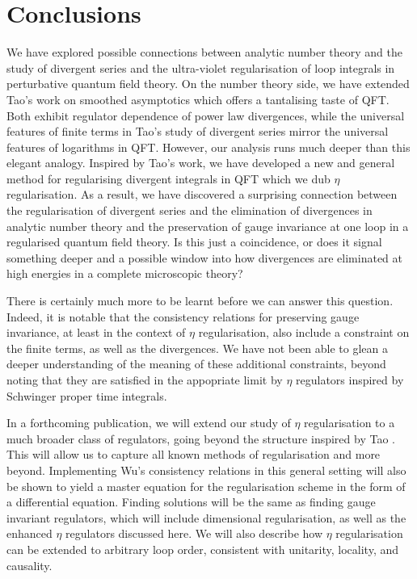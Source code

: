 \documentclass[11pt, letter]{article}
\begin{document}
\section{Conclusions} \label{sec:conc}

We have explored possible connections between analytic number theory and the study of divergent series and the ultra-violet regularisation of loop integrals in perturbative quantum field theory.  On the number theory side, we have extended Tao's work on smoothed asymptotics \cite{Tao11} which offers a tantalising taste of QFT. Both exhibit regulator dependence of power law divergences, while the universal features of finite terms in Tao's study of divergent series mirror the universal features of logarithms in QFT. However, our analysis runs much deeper than this elegant analogy.  Inspired by Tao's work, we have developed a new and general method for regularising divergent  integrals in QFT which we dub $\eta$ regularisation. As a result, we have discovered a surprising connection between the regularisation of divergent series and the elimination of divergences in analytic number theory and the preservation of gauge invariance at one loop in a regularised quantum field theory. Is this just a coincidence, or does it signal something deeper and a possible window into how divergences are eliminated at high energies in a complete microscopic theory?  

There is certainly much more to be learnt before we can answer this question. Indeed, it is notable that the consistency relations for preserving gauge invariance, at least in the context of $\eta$ regularisation, also include a constraint on the finite terms, as well as the divergences. We have not been able to glean a deeper understanding of the meaning of these additional constraints, beyond noting that they are satisfied in the appopriate limit by $\eta$ regulators inspired by Schwinger proper time integrals.

In a forthcoming publication, we will extend our study of $\eta$ regularisation to a much broader class of regulators,  going beyond the structure inspired by Tao \cite{PadillaSmith23}. This will allow us to capture all known methods  of regularisation and more beyond. Implementing Wu's consistency relations \cite{Wu03,Wu04,Wu14} in this general setting will also be shown to yield a master equation for the regularisation scheme in the form of a differential equation. Finding solutions will be the same as finding gauge invariant regulators, which will include dimensional regularisation, as well as the enhanced $\eta$ regulators discussed here. We will also describe how $\eta$ regularisation can be extended to arbitrary loop order, consistent with unitarity, locality, and causality.  
\end{document}
